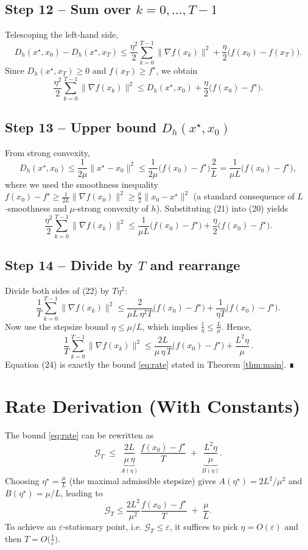 \documentclass{article}
\newcommand{\grad}{\nabla}
\newcommand{\Breg}{D_h}
\begin{document}
\subsection*{Step 12 – Sum over $k=0,\dots,T-1$}
Telescoping the left‑hand side,
\[
\Breg(x^\star,x_0)-\Breg(x^\star,x_T)
\le
\frac{\eta^{2}}{2}\sum_{k=0}^{T-1}\|\grad f(x_k)\|^{2}
   +\frac{\eta}{2}\bigl(f(x_0)-f(x_T)\bigr).
\tag{19}
\]
Since $\Breg(x^\star,x_T)\ge0$ and $f(x_T)\ge f^\star$, we obtain
\[
\frac{\eta^{2}}{2}\sum_{k=0}^{T-1}\|\grad f(x_k)\|^{2}
\le
\Breg(x^\star,x_0)
   +\frac{\eta}{2}\bigl(f(x_0)-f^\star\bigr).
\tag{20}
\]

\subsection*{Step 13 – Upper bound $\Breg(x^\star,x_0)$}
From strong convexity,
\[
\Breg(x^\star,x_0)\le\frac{1}{2\mu}\|x^\star-x_0\|^{2}
\le\frac{1}{2\mu}\bigl(f(x_0)-f^\star\bigr)\frac{2}{L}
=\frac{1}{\mu L}\bigl(f(x_0)-f^\star\bigr),
\tag{21}
\]
where we used the smoothness inequality
$f(x_0)-f^\star\ge \frac{1}{2L}\|\grad f(x_0)\|^{2}\ge
\frac{\mu}{2}\|x_0-x^\star\|^{2}$ (a standard consequence of $L$‑smoothness and
$\mu$‑strong convexity of $h$). Substituting (21) into (20) yields
\[
\frac{\eta^{2}}{2}\sum_{k=0}^{T-1}\|\grad f(x_k)\|^{2}
\le
\frac{1}{\mu L}\bigl(f(x_0)-f^\star\bigr)
   +\frac{\eta}{2}\bigl(f(x_0)-f^\star\bigr).
\tag{22}
\]

\subsection*{Step 14 – Divide by $T$ and rearrange}
Divide both sides of (22) by $T\eta^{2}$:
\[
\frac{1}{T}\sum_{k=0}^{T-1}\|\grad f(x_k)\|^{2}
\le
\frac{2}{\mu L\,\eta^{2}T}\bigl(f(x_0)-f^\star\bigr)
   +\frac{1}{\eta T}\bigl(f(x_0)-f^\star\bigr).
\tag{23}
\]
Now use the stepsize bound $\eta\le\mu/L$, which implies
$\frac{1}{\eta}\le\frac{L}{\mu}$. Hence,
\[
\frac{1}{T}\sum_{k=0}^{T-1}\|\grad f(x_k)\|^{2}
\le
\frac{2L}{\mu\,\eta\,T}\bigl(f(x_0)-f^\star\bigr)
   +\frac{L^{2}\eta}{\mu}\, .
\tag{24}
\]
Equation (24) is exactly the bound \eqref{eq:rate} stated in Theorem
\ref{thm:main}. ∎

\section*{Rate Derivation (With Constants)}
The bound \eqref{eq:rate} can be rewritten as
\[
\mathcal{G}_T \;\le\;
\underbrace{\frac{2L}{\mu\,\eta}}_{\displaystyle A(\eta)}\,
\frac{f(x_0)-f^\star}{T}
\;+\;
\underbrace{\frac{L^{2}\eta}{\mu}}_{\displaystyle B(\eta)} .
\]
Choosing $\eta^\star=\frac{\mu}{L}$ (the maximal admissible stepsize) gives
$A(\eta^\star)=2L^{2}/\mu^{2}$ and $B(\eta^\star)=\mu/L$, leading to
\[
\mathcal{G}_T\le
\frac{2L^{2}}{\mu^{2}}\frac{f(x_0)-f^\star}{T}
\;+\;
\frac{\mu}{L}.
\]
To achieve an $\varepsilon$‑stationary point, i.e. $\mathcal{G}_T\le\varepsilon$,
it suffices to pick $\eta=O(\varepsilon)$ and then
$T=O\bigl(\frac{1}{\varepsilon}\bigr)$.
\end{document}
